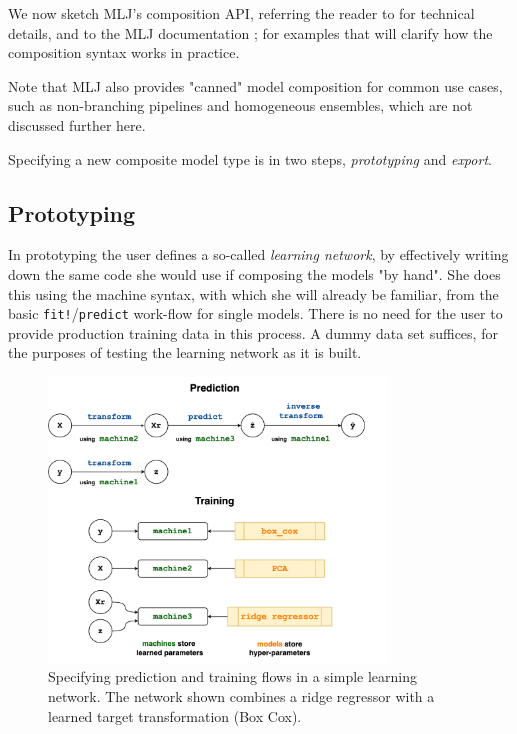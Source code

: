 \documentclass{article}
\begin{document}
We now sketch MLJ's composition API, referring the reader to \cite{Blaom_I} for technical details, and to the MLJ documentation \cite{MLJdocs}; \cite{MLJtutorials} for examples that will clarify how the composition syntax works in practice.

Note that MLJ also provides "canned" model composition for common use cases, such as non-branching pipelines and homogeneous ensembles, which are not discussed further here.

Specifying a new composite model type is in two steps, \textit{prototyping} and \textit{export}.

\subsection{Prototyping}

In prototyping the user defines a so-called \textit{learning network}, by effectively writing down the same code she would use if composing the models "by hand". She does this using the machine syntax, with which she will already be familiar, from the basic \texttt{fit!}/\texttt{predict} work-flow for single models. There is no need for the user to provide production training data in this process. A dummy data set suffices, for the purposes of testing the learning network as it is built.

\begin{figure}
  \centering
  \includegraphics[width=0.8\textwidth]{target_transformerVERTICAL}
  \caption{Specifying prediction and training flows in a simple learning network. The network shown combines a ridge regressor with a learned target transformation (Box Cox).}
  \label{fig:fig2}
\end{figure}
\end{document}
